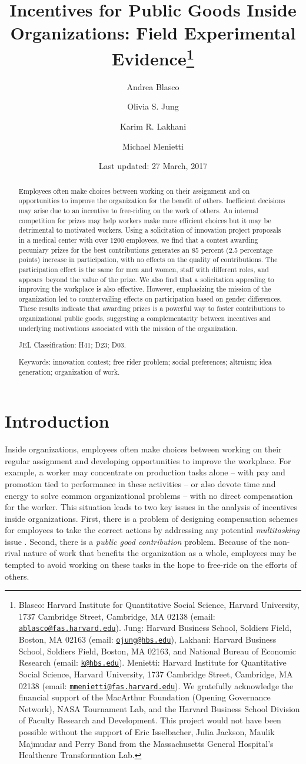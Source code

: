\documentclass[11pt, titlepage]{article}
\institute{}
\title{Incentives for Public Goods Inside Organizations: Field Experimental
Evidence\thanks{Blasco: Harvard Institute for Quantitative Social Science, Harvard
University, 1737 Cambridge Street, Cambridge, MA 02138 (email:
\href{mailto:ablasco@fas.harvard.edu}{\nolinkurl{ablasco@fas.harvard.edu}}).
Jung: Harvard Business School, Soldiers Field, Boston, MA 02163 (email:
\href{mailto:ojung@hbs.edu}{\nolinkurl{ojung@hbs.edu}}), Lakhani:
Harvard Business School, Soldiers Field, Boston, MA 02163, and National
Bureau of Economic Research (email:
\href{mailto:k@hbs.edu}{\nolinkurl{k@hbs.edu}}). Menietti: Harvard
Institute for Quantitative Social Science, Harvard University, 1737
Cambridge Street, Cambridge, MA 02138 (email:
\href{mailto:mmenietti@fas.harvard.edu}{\nolinkurl{mmenietti@fas.harvard.edu}}).
We gratefully acknowledge the financial support of the MacArthur
Foundation (Opening Governance Network), NASA Tournament Lab, and the
Harvard Business School Division of Faculty Research and Development.
This project would not have been possible without the support of Eric
Isselbacher, Julia Jackson, Maulik Majmudar and Perry Band from the
Massachusetts General Hospital's Healthcare Transformation Lab.}}
\author{Andrea Blasco \and Olivia S. Jung \and Karim R. Lakhani \and Michael Menietti}
\date{Last updated: 27 March, 2017}
\begin{document}
\maketitle
\begin{abstract}
Employees often make choices between working on their assignment and on
opportunities to improve the organization for the benefit of others.
Inefficient decisions may arise due to an incentive to free-riding on
the work of others. An internal competition for prizes may help workers
make more efficient choices but it may be detrimental to motivated
workers. Using a solicitation of innovation project proposals in a
medical center with over 1200 employees, we find that a contest awarding
pecuniary prizes for the best contributions generates an 85 percent (2.5
percentage points) increase in participation, with no effects on the
quality of contributions. The participation effect is the same for men
and women, staff with different roles, and appears~beyond the value of
the prize. We also find that a solicitation appealing to improving the
workplace is also effective. However, emphasizing the mission of the
organization led to countervailing effects on participation based on
gender differences. These results indicate that awarding prizes is a
powerful way to foster contributions to organizational public goods,
suggesting a complementarity between incentives and underlying
motivations associated with the mission of the organization.

\smallskip\noindent 
JEL Classification: H41; D23; D03.

\smallskip\noindent 
Keywords: innovation contest; free rider problem; social preferences; altruism; idea generation; organization of work.
\end{abstract}


\clearpage

\section{Introduction}\label{introduction}

Inside organizations, employees often make choices between working on
their regular assignment and developing opportunities to improve the
workplace. For example, a worker may concentrate on production tasks
alone -- with pay and promotion tied to performance in these activities
-- or also devote time and energy to solve common organizational
problems -- with no direct compensation for the worker. This situation
leads to two key issues in the analysis of incentives inside
organizations. First, there is a problem of designing compensation
schemes for employees to take the correct actions by addressing any
potential \emph{multitasking} issue
\citep{holmstrom1991multitask, hellmann2011incentives, manso2011motivating}.
Second, there is a \emph{public good contribution} problem. Because of
the non-rival nature of work that benefits the organization as a whole,
employees may be tempted to avoid working on these tasks in the hope to
free-ride on the efforts of others.
\end{document}
